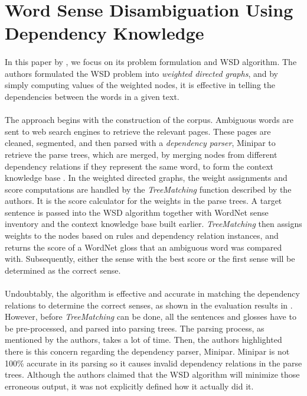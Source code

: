 \section{Word Sense Disambiguation Using Dependency Knowledge}
\paragraph{}
In this paper by \cite{unsupervised}, we focus on its problem formulation and WSD algorithm. The authors formulated the WSD problem into \textit{weighted directed graphs}, and by simply computing values of the weighted nodes, it is effective in telling the dependencies between the words in a given text.

\paragraph{}
The approach begins with the construction of the corpus. Ambiguous words are sent to web search engines to retrieve the relevant pages. These pages are cleaned, segmented, and then parsed with a \textit{dependency parser}, Minipar \cite{minipar} to retrieve the parse trees, which are merged, by merging nodes from different dependency relations if they represent the same word, to form the context knowledge base \cite{unsupervised}. In the weighted directed graphs, the weight assignments and score computations are handled by the \textit{TreeMatching} function described by the authors. It is the score calculator for the weights in the parse trees. A target sentence is passed into the WSD algorithm together with WordNet sense inventory and the context knowledge base built earlier. \textit{TreeMatching} then assigns weights to the nodes based on rules and dependency relation instances, and returns the score of a WordNet gloss that an ambiguous word was compared with. Subsequently, either the sense with the best score or the first sense will be determined as the correct sense.

\paragraph{}
Undoubtably, the algorithm is effective and accurate in matching the dependency relations to determine the correct senses, as shown in the evaluation results in \cite{unsupervised}. However, before \textit{TreeMatching} can be done, all the sentences and glosses have to be pre-processed, and parsed into parsing trees. The parsing process, as mentioned by the authors, takes a lot of time. Then, the authors highlighted there is this concern regarding the dependency parser, Minipar. Minipar is not 100\% accurate in its parsing so it causes invalid dependency relations in the parse trees. Although the authors claimed that the WSD algorithm will minimize those erroneous output, it was not explicitly defined how it actually did it.

